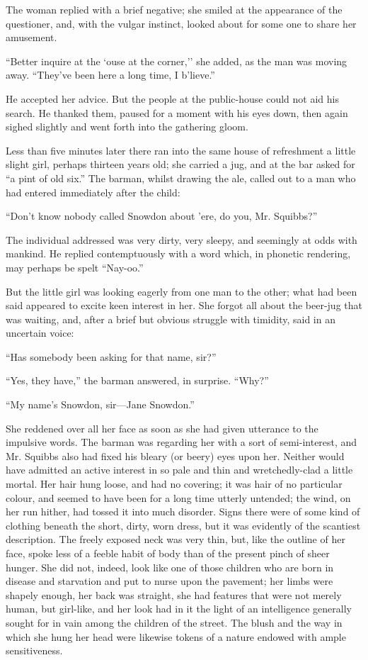 The woman replied with a brief negative; she smiled at the appearance of
the questioner, and, with the vulgar instinct, looked about for some one
to share her amusement.

``Better inquire at the `ouse at the corner,'' she added, as the man was
moving away. ``They've been here a long time, I b'lieve.''

He accepted her advice. But the people {}at the public-house could not
aid his search. He thanked them, paused for a moment with his eyes down,
then again sighed slightly and went forth into the gathering gloom.

Less than five minutes later there ran into the same house of
refreshment a little slight girl, perhaps thirteen years old; she
carried a jug, and at the bar asked for ``a pint of old six.'' The
barman, whilst drawing the ale, called out to a man who had entered
immediately after the child:

``Don't know nobody called Snowdon about 'ere, do you, Mr. Squibbs?''

The individual addressed was very dirty, very sleepy, and seemingly at
odds with mankind. He replied contemptuously with a word which, in
phonetic rendering, may perhaps be spelt ``Nay-oo.''

But the little girl was looking eagerly from one man to the other; what
had been said appeared to excite keen interest in her. She forgot all
about the beer-jug that was waiting, and, after a brief but obvious
struggle with timidity, said in an uncertain voice:

{}``Has somebody been asking for that name, sir?''

``Yes, they have,'' the barman answered, in surprise. ``Why?''

``My name's Snowdon, sir---Jane Snowdon.''

She reddened over all her face as soon as she had given utterance to the
impulsive words. The barman was regarding her with a sort of
semi-interest, and Mr. Squibbs also had fixed his bleary (or beery) eyes
upon her. Neither would have admitted an active interest in so pale and
thin and wretchedly-clad a little mortal. Her hair hung loose, and had
no covering; it was hair of no particular colour, and seemed to have
been for a long time utterly untended; the wind, on her run hither, had
tossed it into much disorder. Signs there were of some kind of clothing
beneath the short, dirty, worn dress, but it was evidently of the
scantiest description. The freely exposed neck was very thin, but, like
the outline of her face, spoke less of a feeble habit of body than of
the present pinch of sheer hunger. She did not, indeed, {}look like one
of those children who are born in disease and starvation and put to
nurse upon the pavement; her limbs were shapely enough, her back was
straight, she had features that were not merely human, but girl-like,
and her look had in it the light of an intelligence generally sought for
in vain among the children of the street. The blush and the way in which
she hung her head were likewise tokens of a nature endowed with ample
sensitiveness.

